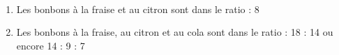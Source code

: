    \ \\ [-5mm]
   \begin{enumerate}
      \item Les bonbons à la fraise et au citron sont dans le ratio { : 8}
      \item Les bonbons à la fraise, au citron et au cola sont dans le ratio { : 18 : 14} ou encore 14 : 9 : 7
   \end{enumerate}
